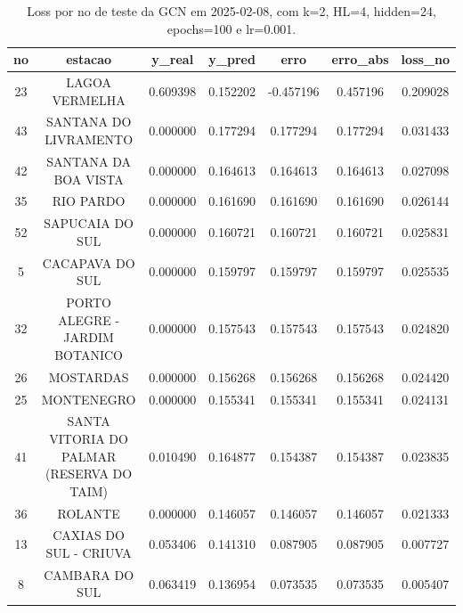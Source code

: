 \begin{table}[h]
\centering
\caption{Loss por no de teste da GCN em 2025-02-08, com k=2, HL=4, hidden=24, epochs=100 e lr=0.001.}
\label{tab:gcn_loss_k2_hl4_h24_e100_d20250208}
\begin{tabular}{ccccccc}
\toprule
no & estacao & y\_real & y\_pred & erro & erro\_abs & loss\_no \\
\midrule
23 & LAGOA VERMELHA & 0.609398 & 0.152202 & -0.457196 & 0.457196 & 0.209028 \\
43 & SANTANA DO LIVRAMENTO & 0.000000 & 0.177294 & 0.177294 & 0.177294 & 0.031433 \\
42 & SANTANA DA BOA VISTA & 0.000000 & 0.164613 & 0.164613 & 0.164613 & 0.027098 \\
35 & RIO PARDO & 0.000000 & 0.161690 & 0.161690 & 0.161690 & 0.026144 \\
52 & SAPUCAIA DO SUL & 0.000000 & 0.160721 & 0.160721 & 0.160721 & 0.025831 \\
5 & CACAPAVA DO SUL & 0.000000 & 0.159797 & 0.159797 & 0.159797 & 0.025535 \\
32 & PORTO ALEGRE - JARDIM BOTANICO & 0.000000 & 0.157543 & 0.157543 & 0.157543 & 0.024820 \\
26 & MOSTARDAS & 0.000000 & 0.156268 & 0.156268 & 0.156268 & 0.024420 \\
25 & MONTENEGRO & 0.000000 & 0.155341 & 0.155341 & 0.155341 & 0.024131 \\
41 & SANTA VITORIA DO PALMAR (RESERVA DO TAIM) & 0.010490 & 0.164877 & 0.154387 & 0.154387 & 0.023835 \\
36 & ROLANTE & 0.000000 & 0.146057 & 0.146057 & 0.146057 & 0.021333 \\
13 & CAXIAS DO SUL - CRIUVA & 0.053406 & 0.141310 & 0.087905 & 0.087905 & 0.007727 \\
8 & CAMBARA DO SUL & 0.063419 & 0.136954 & 0.073535 & 0.073535 & 0.005407 \\
\bottomrule
\end{tabular}
\end{table}
